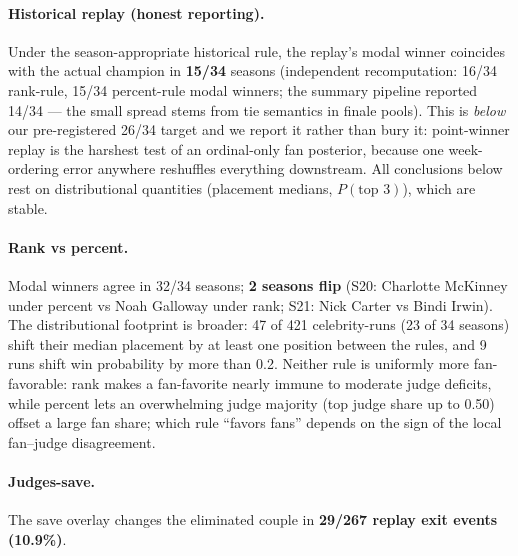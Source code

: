 \documentclass[11pt]{article}
\begin{document}
\paragraph{Historical replay (honest reporting).} Under the season-appropriate
historical rule, the replay's modal winner coincides with the actual champion in
\textbf{15/34} seasons (independent recomputation: 16/34 rank-rule, 15/34
percent-rule modal winners; the summary pipeline reported 14/34 --- the small
spread stems from tie semantics in finale pools). This is \emph{below} our
pre-registered 26/34 target and we report it rather than bury it: point-winner
replay is the harshest test of an ordinal-only fan posterior, because one
week-ordering error anywhere reshuffles everything downstream. All conclusions
below rest on distributional quantities (placement medians, $P(\text{top 3})$),
which are stable.

\paragraph{Rank vs percent.} Modal winners agree in 32/34 seasons; \textbf{2
seasons flip} (S20: Charlotte McKinney under percent vs Noah Galloway under rank;
S21: Nick Carter vs Bindi Irwin). The distributional footprint is broader: 47 of
421 celebrity-runs (23 of 34 seasons) shift their median placement by at least one
position between the rules, and 9 runs shift win probability by more than 0.2.
Neither rule is uniformly more fan-favorable: rank makes a fan-favorite nearly
immune to moderate judge deficits, while percent lets an overwhelming judge
majority (top judge share up to 0.50) offset a large fan share; which rule
``favors fans'' depends on the sign of the local fan--judge disagreement.

\paragraph{Judges-save.} The save overlay changes the eliminated couple in
\textbf{29/267 replay exit events (10.9\%)}.
\end{document}
